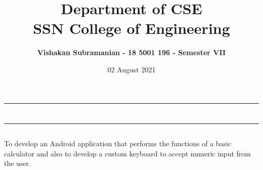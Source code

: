 \documentclass[12pt, a4]{article}
\title{\textbf{Department of CSE\\SSN College of Engineering}}
\author{\textbf{Vishakan Subramanian - 18 5001 196 - Semester VII}}
\date{02 August 2021}
\begin{document}
\maketitle
\hrule
\section*{}
\hrule
\bigskip

\subsection*{}
\subsection*{}
\begin{flushleft}
To develop an Android application that performs the functions of a basic calculator and also to develop a custom keyboard to accept numeric input from the user.

\end{flushleft}

\newpage
\subsection*{}
\begin{flushleft}

\end{flushleft}

\newpage
\subsection*{}
\begin{flushleft}

\end{flushleft}

\newpage
\subsection*{}
\begin{flushleft}

\end{flushleft}
\end{document}
